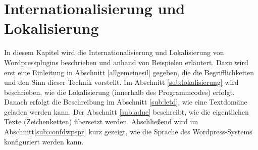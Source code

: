 \section{Internationalisierung und Lokalisierung}\label{interundlok}
In diesem Kapitel wird die Internationalisierung und Lokalisierung von Wordpressplugins beschrieben und anhand von Beispielen erläutert. Dazu wird erst eine Einleitung in Abschnitt \ref{allgemeinesil} gegeben, die die Begrifflichkeiten und den Sinn dieser Technik vorstellt. Im Abschnitt \ref{sub:lokalisierung} wird beschrieben, wie die Lokalisierung (innerhalb des Programmcodes) erfolgt. Danach erfolgt die Beschreibung im Abschnitt \ref{sub:letd}, wie eine Textdomäne geladen werden kann. Der Abschnitt \ref{sub:adue} beschreibt, wie die eigentlichen Texte (Zeichenketten) übersetzt werden. Abschließend wird im Abschnitt\ref{sub:confdwpspr} kurz gezeigt, wie die Sprache des Wordpress-Systems konfiguriert werden kann.
